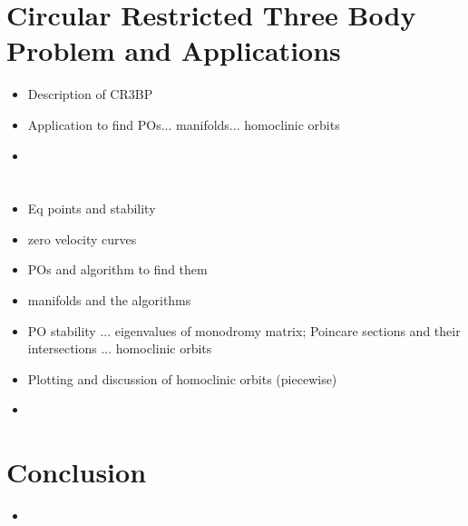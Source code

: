 \documentclass[11pt]{article} %
\begin{document}
\section*{Circular Restricted Three Body Problem and Applications}
\begin{itemize}
	\item \color{red}Description of CR3BP
	\item Application to find POs... manifolds... homoclinic orbits
	\item \color{black}
\end{itemize}

\section*{\color{red}{Periodic/Homoclinic Orbits}}
\begin{itemize}
	\item \color{red}Eq points and stability
	\item zero velocity curves
	\item POs and algorithm to find them
	\item manifolds and the algorithms
	\item PO stability ... eigenvalues of monodromy matrix; Poincare sections and their intersections ... homoclinic orbits
	\item Plotting and discussion of homoclinic orbits (piecewise)
	\item \color{black}
\end{itemize}

\section*{Conclusion}
\begin{itemize}
	\item \color{red}{Homoclinic orbits are cool/interesting, but for spacecraft applications they aren't very useful; Heteroclinic orbits are useful fa show}\color{black}
\end{itemize}

\newpage


\end{document}
